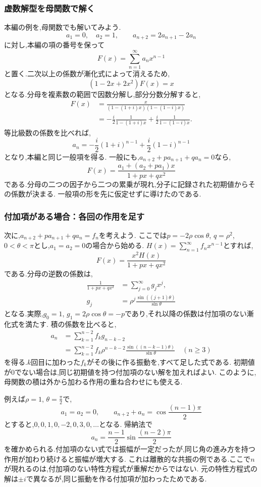 \subsubsection{虚数解型を母関数で解く}\label{節：虚数解型を母関数で解く}
本編の例を,母関数でも解いてみよう.
\[
  a_1=0,\quad a_2=1,\qquad a_{n+2}=2a_{n+1}-2a_n
\]
に対し,本編の項の番号を保って
\[
  F(x)=\sum_{n=1}^\infty a_nx^{n-1}
\]
と置く.二次以上の係数が漸化式によって消えるため,
\[
  (1-2x+2x^2)F(x)=x
\]
となる.分母を複素数の範囲で因数分解し,部分分数分解すると,
\[
  \begin{aligned}
    F(x)&=\frac{x}{(1-(1+i)x)(1-(1-i)x)}\\
      &=-\frac{i}{2}\frac{1}{1-(1+i)x}
         +\frac{i}{2}\frac{1}{1-(1-i)x}.
  \end{aligned}
\]
等比級数の係数を比べれば,
\[
  a_n=-\frac{i}{2}(1+i)^{n-1}+\frac{i}{2}(1-i)^{n-1}
\]
となり,本編と同じ一般項を得る.
一般にも,$a_{n+2}+pa_{n+1}+qa_n=0$なら,
\[
  F(x)=\frac{a_1+(a_2+pa_1)x}{1+px+qx^2}
\]
である.分母の二つの因子から二つの累乗が現れ,分子に記録された初期値からその係数が決まる.
一般項の形を先に仮定せずに導けたのである.

\subsubsection{付加項がある場合：各回の作用を足す}
次に,$a_{n+2}+pa_{n+1}+qa_n=f_n$を考えよう.
ここでは$p=-2\rho\cos\theta$, $q=\rho^2$, $0<\theta<\pi$とし,$a_1=a_2=0$の場合から始める.
$H(x)=\sum_{n=1}^\infty f_nx^{n-1}$とすれば,
\[
  F(x)=\frac{x^2H(x)}{1+px+qx^2}
\]
である.分母の逆数の係数は,
\[
  \begin{aligned}
    \frac{1}{1+px+qx^2}
      &=\sum_{j=0}^\infty g_jx^j,\\
    g_j&=\rho^j\frac{\sin((j+1)\theta)}{\sin\theta}
  \end{aligned}
\]
となる.実際,$g_0=1$, $g_1=2\rho\cos\theta=-p$であり,それ以降の係数は付加項のない漸化式を満たす.
積の係数を比べると,
\[
  \begin{aligned}
    a_n&=\sum_{k=1}^{n-2}f_kg_{n-k-2}\\
       &=\sum_{k=1}^{n-2}f_k\rho^{n-k-2}
         \frac{\sin((n-k-1)\theta)}{\sin\theta}
         \quad(n\ge3)
  \end{aligned}
\]
を得る.$k$回目に加わった$f_k$がその後に作る振動を,すべて足した式である.
初期値が0でない場合は,同じ初期値を持つ付加項のない解を加えればよい.
このように,母関数の積は外から加わる作用の重ね合わせにも使える.

例えば$\rho=1$, $\theta=\frac{\pi}{2}$で,
\[
  a_1=a_2=0,\qquad
  a_{n+2}+a_n=\cos\frac{(n-1)\pi}{2}
\]
とすると,$0,0,1,0,-2,0,3,0,\ldots$となる.
帰納法で
\[
  a_n=\frac{n-1}{2}\sin\frac{(n-2)\pi}{2}
\]
を確かめられる.付加項のない式では振幅が一定だったが,同じ角の進み方を持つ作用が加わり続けると振幅が増大する.
これは離散的な共振の例である.ここで$n$が現れるのは,付加項のない特性方程式が重解だからではない.
元の特性方程式の解は$\pm i$で異なるが,同じ振動を作る付加項が加わったためである.
